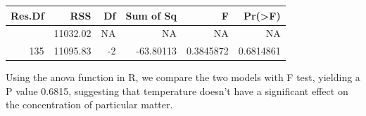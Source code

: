 \documentclass[12pt,halfline,a4paper,]{ouparticle}
\begin{document}
\begin{longtable}[]{@{}rrrrrr@{}}
\toprule\noalign{}
Res.Df & RSS & Df & Sum of Sq & F & Pr(\textgreater F) \\
\midrule\noalign{}
\endhead
\bottomrule\noalign{}
\endlastfoot
133 & 11032.02 & NA & NA & NA & NA \\
135 & 11095.83 & -2 & -63.80113 & 0.3845872 & 0.6814861 \\
\end{longtable}

Using the anova function in R, we compare the two models with F test,
yielding a P value 0.6815, suggesting that temperature doesn't have a
significant effect on the concentration of particular matter.
\end{document}
